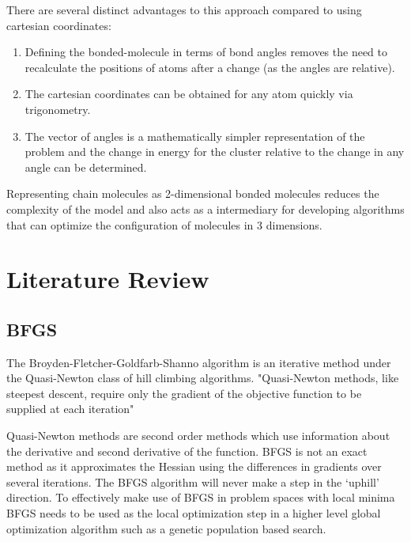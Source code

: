 \documentclass[conference,letterpaper]{IEEEtran}
\begin{document}
There are several distinct advantages to this approach compared to using cartesian coordinates:
\begin{enumerate}
    \item Defining the bonded-molecule in terms of bond angles removes the need to recalculate the positions of atoms after a change (as the angles are relative).
    \item The cartesian coordinates can be obtained for any atom quickly via trigonometry.
    \item The vector of angles is a mathematically simpler representation of the problem and the change in energy for the cluster relative to the change in any angle can be determined.
\end{enumerate}
\par Representing chain molecules as 2-dimensional bonded molecules reduces the complexity of the model and also acts as a intermediary for developing algorithms that can optimize the configuration of molecules in 3 dimensions.

\section{Literature Review}
\subsection{BFGS}
\par The Broyden-Fletcher-Goldfarb-Shanno algorithm is an iterative method under the Quasi-Newton class of hill climbing algorithms. "Quasi-Newton methods, like steepest descent, require only the gradient of the objective function to be supplied at each iteration" \cite{numericalOptimization} 
\par Quasi-Newton methods are second order methods which use information about the derivative and second derivative of the function. BFGS is not an exact method as it approximates the Hessian using the differences in gradients over several iterations. The BFGS algorithm will never make a step in the `uphill' direction. To effectively make use of BFGS in problem spaces with local minima BFGS needs to be used as the local optimization step in a higher level global optimization algorithm such as a genetic population based search. 
\end{document}
